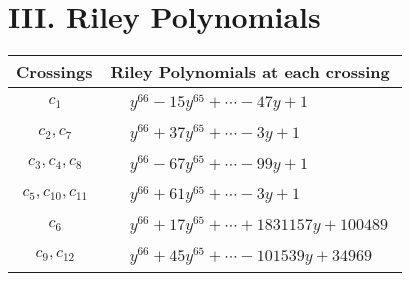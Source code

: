 \documentclass[1p]{elsarticle_modified}
\theoremstyle{definition}
\begin{document}
\centering \section*{ III. Riley Polynomials}
\begin{tabular}{m{50pt}|m{274pt}}
Crossings & \hspace{64pt}Riley Polynomials at each crossing \\
\hline $$\begin{aligned}c_{1}\end{aligned}$$&$\begin{aligned}
&y^{66}-15 y^{65}+\cdots-47 y+1
\end{aligned}$\\
\hline $$\begin{aligned}c_{2},c_{7}\end{aligned}$$&$\begin{aligned}
&y^{66}+37 y^{65}+\cdots-3 y+1
\end{aligned}$\\
\hline $$\begin{aligned}c_{3},c_{4},c_{8}\end{aligned}$$&$\begin{aligned}
&y^{66}-67 y^{65}+\cdots-99 y+1
\end{aligned}$\\
\hline $$\begin{aligned}c_{5},c_{10},c_{11}\end{aligned}$$&$\begin{aligned}
&y^{66}+61 y^{65}+\cdots-3 y+1
\end{aligned}$\\
\hline $$\begin{aligned}c_{6}\end{aligned}$$&$\begin{aligned}
&y^{66}+17 y^{65}+\cdots+1831157 y+100489
\end{aligned}$\\
\hline $$\begin{aligned}c_{9},c_{12}\end{aligned}$$&$\begin{aligned}
&y^{66}+45 y^{65}+\cdots-101539 y+34969
\end{aligned}$\\
\hline
\end{tabular}
\vskip 2pc
\end{document}
